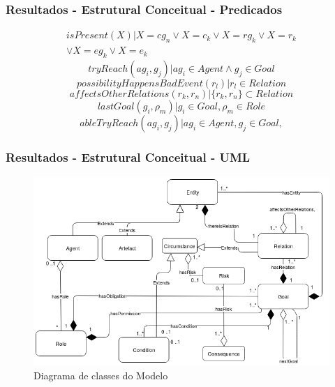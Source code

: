\documentclass{beamer}
\begin{document}
\begin{frame}
	\frametitle{Resultados - Estrutural Conceitual - Predicados}
	\begin{eqnarray}				
		isPresent(X) | X = cg_n \vee X = c_k \vee X = rg_k \vee X = r_k  \\ \nonumber
		\vee X = eg_k \vee X = e_k
	\end{eqnarray}
	\begin{equation}				
		tryReach(ag_i,g_j) | ag_i \in Agent \wedge g_j \in Goal 	
	\end{equation}
	\begin{equation}
	    possibilityHappensBadEvent(r_l) | r_l \in Relation
	\end{equation}
	\begin{equation}
	    affectsOtherRelations(r_k,r_n) | \{ r_k, r_n\} \subset Relation
	\end{equation}
	\begin{equation}
	    lastGoal(g_i,\rho_m) | g_i \in Goal, \rho_m \in Role
	\end{equation}
	\begin{equation}
		ableTryReach(ag_i,g_j) | ag_i \in Agent, g_j \in Goal,
	\end{equation}		
\end{frame}
\begin{frame}
	\frametitle{Resultados - Estrutural Conceitual - UML}
	\begin{figure}[H]
	  \centering
	  \includegraphics[width=1\linewidth]{figure/Class.png} 
	  \caption{Diagrama de classes do Modelo }
	  \label{classdiagrama}
	\end{figure}
\end{frame}
\end{document}
